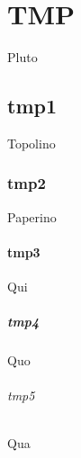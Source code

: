 
\chapter{TMP}
\label{tmp}
Pluto
\section{tmp1}
Topolino
\subsection{tmp2}
Paperino
\subsubsection{tmp3}
Qui
\paragraph{tmp4}
Quo
\subparagraph{tmp5}
Qua




